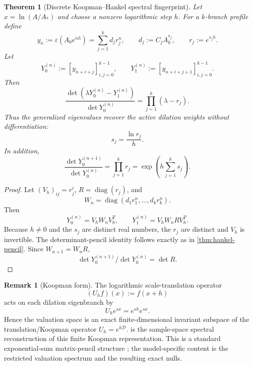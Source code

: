 \documentclass[aps,prd,preprint,onecolumn,nofootinbib,superscriptaddress,showkeys]{revtex4-2}
\numberwithin{equation}{section}
\theoremstyle{definition}
\newtheorem{remark}{Remark}[section]
\theoremstyle{plain}
\newtheorem{theorem}{Theorem}[section]
\newcommand{\Dil}{\mathscr D}
\newcommand{\diag}{\operatorname{diag}}
\begin{document}
\begin{theorem}[Discrete Koopman--Hankel spectral fingerprint]\label{thm:discrete-hankel}
Let $x=\ln(A/A_*)$ and choose a nonzero logarithmic step $h$.  For a $k$-branch profile define
\[
y_n:=\varepsilon(A_0e^{nh})
=\sum_{j=1}^k d_j r_j^n,
\qquad
d_j:=C_jA_0^{s_j},
\qquad
r_j:=e^{s_jh}.
\]
Let
\begin{equation}
Y_0^{(n)}:=[y_{n+i+j}]_{i,j=0}^{k-1},
\qquad
Y_1^{(n)}:=[y_{n+i+j+1}]_{i,j=0}^{k-1}.
\end{equation}
Then
\begin{equation}
\boxed{
\frac{\det(\lambda Y_0^{(n)}-Y_1^{(n)})}
{\det Y_0^{(n)}}
=
\prod_{j=1}^k(\lambda-r_j).
}
\end{equation}
Thus the generalized eigenvalues recover the active dilation weights without differentiation:
\begin{equation}
\boxed{
s_j=\frac{\ln r_j}{h}.
}
\end{equation}
In addition,
\begin{equation}
\boxed{
\frac{\det Y_0^{(n+1)}}{\det Y_0^{(n)}}
=
\prod_{j=1}^k r_j
=
\exp\!\left(h\sum_{j=1}^k s_j\right).
}
\end{equation}
\end{theorem}

\begin{proof}
Let $(V_h)_{ij}=r_j^i$, $R=\diag(r_j)$, and
\[
W_n=\diag(d_1r_1^n,\ldots,d_kr_k^n).
\]
Then
\[
Y_0^{(n)}=V_hW_nV_h^T,
\qquad
Y_1^{(n)}=V_hW_nRV_h^T.
\]
Because $h\neq0$ and the $s_j$ are distinct real numbers, the $r_j$ are distinct and $V_h$ is invertible.  The determinant-pencil identity follows exactly as in \cref{thm:hankel-pencil}.  Since $W_{n+1}=W_nR$,
\[
\det Y_0^{(n+1)}/\det Y_0^{(n)}=\det R.
\]
\end{proof}

\begin{remark}[Koopman form]
The logarithmic scale-translation operator
\[
(U_hf)(x):=f(x+h)
\]
acts on each dilation eigenbranch by
\[
U_he^{sx}=e^{sh}e^{sx}.
\]
Hence the valuation space is an exact finite-dimensional invariant subspace of the translation/Koopman operator $U_h=e^{h\Dil}$.   is the sample-space spectral reconstruction of this finite Koopman representation.  This is a standard exponential-sum matrix-pencil structure \cite{HuaSarkar1990,PeterPlonka2013,FischerEtAl2020}; the model-specific content is the restricted valuation spectrum and the resulting exact nulls.
\end{remark}
\end{document}
